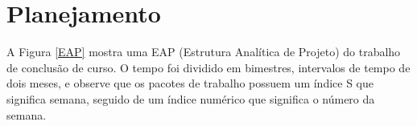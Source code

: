 



%
%
%
%
%
%
%
%


\section{Planejamento}
\label{Cronograma e Execução}
A Figura \ref{EAP} mostra uma EAP (Estrutura Analítica de Projeto) do trabalho de conclusão de curso. O tempo foi dividido em bimestres, intervalos de tempo de dois meses, e observe que os pacotes de trabalho possuem um índice S que significa semana, seguido de um índice numérico que significa o número da semana.


